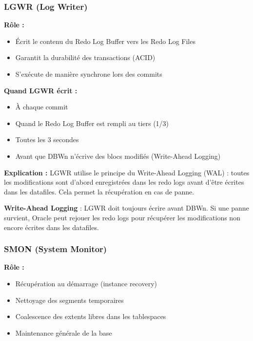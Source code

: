 \documentclass[11pt,a4paper]{article}
\begin{document}
\subsubsection{LGWR (Log Writer)}

\textbf{Rôle :}
\begin{itemize}
    \item Écrit le contenu du Redo Log Buffer vers les Redo Log Files
    \item Garantit la durabilité des transactions (ACID)
    \item S'exécute de manière synchrone lors des commits
\end{itemize}

\textbf{Quand LGWR écrit :}
\begin{itemize}
    \item À chaque commit
    \item Quand le Redo Log Buffer est rempli au tiers (1/3)
    \item Toutes les 3 secondes
    \item Avant que DBWn n'écrive des blocs modifiés (Write-Ahead Logging)
\end{itemize}

\textbf{Explication :} LGWR utilise le principe du Write-Ahead Logging (WAL) : toutes les modifications sont d'abord enregistrées dans les redo logs avant d'être écrites dans les datafiles. Cela permet la récupération en cas de panne.

\begin{importantbox}
\textbf{Write-Ahead Logging} : LGWR doit toujours écrire avant DBWn. Si une panne survient, Oracle peut rejouer les redo logs pour récupérer les modifications non encore écrites dans les datafiles.
\end{importantbox}

\subsubsection{SMON (System Monitor)}

\textbf{Rôle :}
\begin{itemize}
    \item Récupération au démarrage (instance recovery)
    \item Nettoyage des segments temporaires
    \item Coalescence des extents libres dans les tablespaces
    \item Maintenance générale de la base
\end{itemize}
\end{document}
